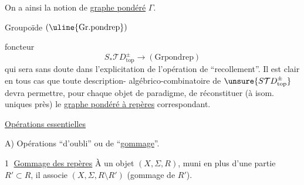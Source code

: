 
On a ainsi la notion de \uline{graphe pondéré}   $\Gamma$.


Groupoïde $(\uline{\mathrm{Gr.pondrep}})$

foncteur
\[
 S_*\mathcal TD_{\mathrm{top}}^\pm\longrightarrow(\mathrm{Grpondrep})
\]
qui sera  sans doute dans l'explicitation de l'opération de ``recollement''.
Il est clair en tous cas que toute description- algébrico-combinatoire de
$\unsure{S\mathcal TD_{\mathrm{top}}^\pm}$ devra permettre, pour chaque objet de
 paradigme, de réconstituer (à isom. uniques près) le \uline{graphe pondéré à repères} correspondant.

\uline{Opérations essentielles}

A) Opérations ``d'oubli'' ou de ``\uline{gommage}''.

\textcircled{1} \uline{Gommage des repères} À un objet $(X,\Sigma,R)$, muni en plus d'une partie $R'\subset R$, il associe $(X,\Sigma,R\setminus R')$ (gommage de $R'$).
